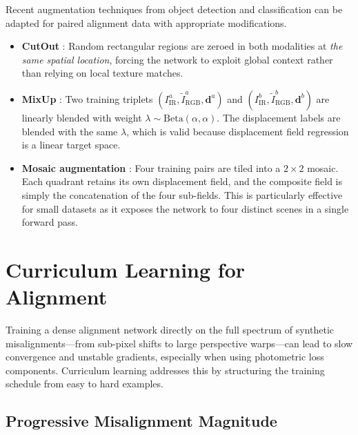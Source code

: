 Recent augmentation techniques from object detection and classification can
be adapted for paired alignment data with appropriate modifications.

\begin{itemize}
    \item \textbf{CutOut} \cite{devries2017cutout}: Random rectangular regions
          are zeroed in both modalities at \emph{the same spatial location},
          forcing the network to exploit global context rather than relying on
          local texture matches.
    \item \textbf{MixUp} \cite{zhang2018mixup}: Two training triplets
          $(I_{\mathrm{IR}}^{a}, \tilde{I}_{\mathrm{RGB}}^{a},
          \mathbf{d}^{a})$ and
          $(I_{\mathrm{IR}}^{b}, \tilde{I}_{\mathrm{RGB}}^{b},
          \mathbf{d}^{b})$ are linearly blended with weight $\lambda \sim
          \mathrm{Beta}(\alpha, \alpha)$.  The displacement labels are blended
          with the same $\lambda$, which is valid because displacement field
          regression is a linear target space.
    \item \textbf{Mosaic augmentation} \cite{bochkovskiy2020yolov4}: Four
          training pairs are tiled into a $2\times2$ mosaic.  Each quadrant
          retains its own displacement field, and the composite field is simply
          the concatenation of the four sub-fields.  This is particularly
          effective for small datasets as it exposes the network to four
          distinct scenes in a single forward pass.
\end{itemize}


\section{Curriculum Learning for Alignment}
\label{sec:curriculum}

Training a dense alignment network directly on the full spectrum of
synthetic misalignments---from sub-pixel shifts to large perspective
warps---can lead to slow convergence and unstable gradients, especially when
using photometric loss components.  Curriculum learning
\cite{bengio2009curriculum} addresses this by structuring the training
schedule from easy to hard examples.

\subsection{Progressive Misalignment Magnitude}
\label{subsec:progressive}

